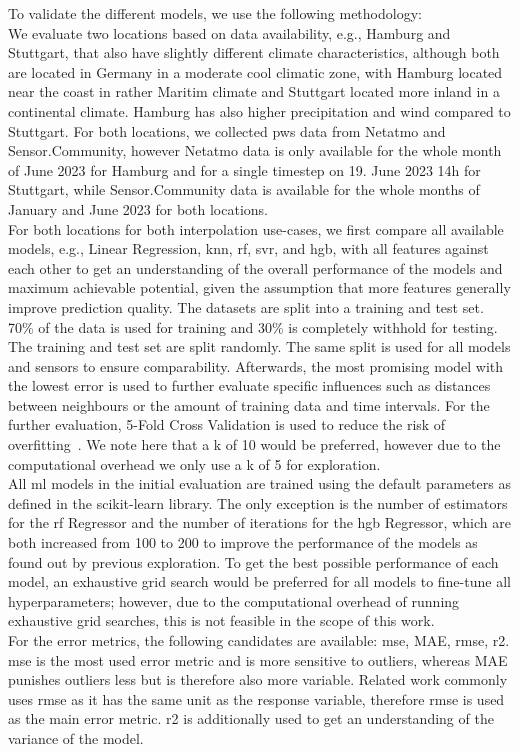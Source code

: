 To validate the different models, we use the following methodology:\\
We evaluate two locations based on data availability, e.g., Hamburg and Stuttgart, that also have slightly different climate characteristics, although both are located in Germany in a moderate cool climatic zone, with Hamburg located near the coast in rather Maritim climate and Stuttgart located more inland in a continental climate. Hamburg has also higher precipitation and wind compared to Stuttgart.
For both locations, we collected \gls{pws} data from Netatmo and Sensor.Community, however Netatmo data is only available for the whole month of June 2023 for Hamburg and for a single timestep on 19. June 2023 14h for Stuttgart, while Sensor.Community data is available for the whole months of January and June 2023 for both locations.\\
For both locations for both interpolation use-cases, we first compare all available models, e.g., Linear Regression, \gls{knn}, \gls{rf}, \gls{svr}, and \gls{hgb}, with all features against each other to get an understanding of the overall performance of the models and maximum achievable potential, given the assumption that more features generally improve prediction quality. The datasets are split into a training and test set. 70\% of the data is used for training and 30\% is completely withhold for testing. The training and test set are split randomly. The same split is used for all models and sensors to ensure comparability.
Afterwards, the most promising model with the lowest error is used to further evaluate specific influences such as distances between neighbours or the amount of training data and time intervals. For the further evaluation, 5-Fold Cross Validation is used to reduce the risk of overfitting~\cite{kohavi1995study}. We note here that a k of 10 would be preferred, however due to the computational overhead we only use a k of 5 for exploration.\\
All \gls{ml} models in the initial evaluation are trained using the default parameters as defined in the scikit-learn library. The only exception is the number of estimators for the \gls{rf} Regressor and the number of iterations for the \gls{hgb} Regressor, which are both increased from 100 to 200 to improve the performance of the models as found out by previous exploration. To get the best possible performance of each model, an exhaustive grid search would be preferred for all models to fine-tune all hyperparameters; however, due to the computational overhead of running exhaustive grid searches, this is not feasible in the scope of this work.\\
For the error metrics, the following candidates are available: \gls{mse}, MAE, \gls{rmse}, \gls{r2}. \gls{mse} is the most used error metric and is more sensitive to outliers, whereas MAE punishes outliers less but is therefore also more variable. Related work commonly uses \gls{rmse} as it has the same unit as the response variable, therefore \gls{rmse} is used as the main error metric. \gls{r2} is additionally used to get an understanding of the variance of the model.

